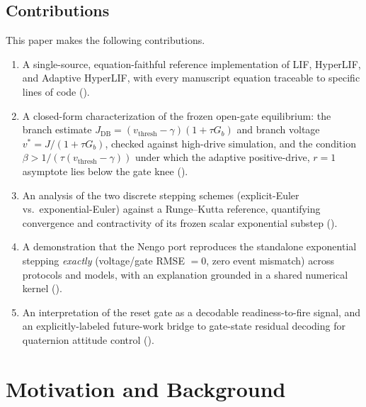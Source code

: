 \documentclass[journal]{IEEEtran}
\newcommand{\vth}{v_{\mathrm{thresh}}}
\newcommand{\Gb}{G_{b}}
\newcommand{\Jdb}{J_{\mathrm{DB}}}
\begin{document}
\subsection*{Contributions}
This paper makes the following contributions.
\begin{enumerate}
  \item A single-source, equation-faithful reference implementation of LIF,
  HyperLIF, and Adaptive HyperLIF, with every manuscript equation traceable to
  specific lines of code ().
  \item A closed-form characterization of the frozen open-gate equilibrium:
  the branch estimate $\Jdb=(\vth-\gamma)(1+\tau\Gb)$ and branch voltage
  $v^\ast=J/(1+\tau\Gb)$, checked against high-drive simulation, and the
  condition $\beta>1/(\tau(\vth-\gamma))$ under which the adaptive positive-drive,
  $r=1$ asymptote lies below the gate knee
  ().
  \item An analysis of the two discrete stepping schemes (explicit-Euler vs.\
  exponential-Euler) against a Runge--Kutta reference, quantifying convergence
  and contractivity of its frozen scalar exponential substep
  ().
  \item A demonstration that the Nengo port reproduces the standalone
  exponential stepping \emph{exactly} (voltage/gate RMSE $=0$, zero event
  mismatch) across protocols and models, with an explanation grounded in a
  shared numerical kernel (\Cref{sec:nengo,sec:results-parity}).
  \item An interpretation of the reset gate as a decodable readiness-to-fire
  signal, and an explicitly-labeled future-work bridge to gate-state residual
  decoding for quaternion attitude control
  ().
\end{enumerate}

\section{Motivation and Background}\label{sec:background}
\end{document}
